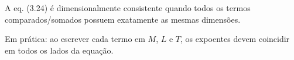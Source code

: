 A eq. (3.24) é dimensionalmente consistente quando todos os termos comparados/somados possuem exatamente as mesmas dimensões.

Em prática: ao escrever cada termo em $M$, $L$ e $T$, os expoentes devem coincidir em todos os lados da equação.

